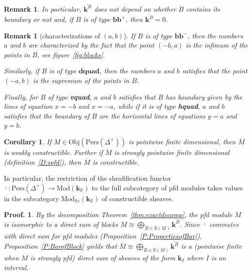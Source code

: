 \documentclass[a4paper, english, 11pt]{article}
\newcommand{\kk}[0]{\textbf{k}}
\newcommand{\Mod}[0]{\text{Mod}}
\newcommand{\Pe}{\text{Pers}}
\newcommand{\0}{\vec{0}}
\newcommand{\R}[0]{\mathbb{R}}
\newcommand{\Obj}[0]{\text{Obj}}
\newtheorem*{pf}{Proof.} }
\newtheorem{cor}[prop]{Corollary}
\newtheorem{remark}[prop]{Remark}
\begin{document}
\begin{remark}
In particular, $\overline{\kk^B}$ does not depend on whether $B$ contains its boundary or not and, if $B$ is of type $\textbf{bb}^+$, then $\overline{\kk^B} =0$. 
\end{remark}
\begin{remark}[characterizations of $(a,b)$]\label{R:caracofab}
 If $B$ is of type $\textbf{bb}^-$, then the numbers $a$ and $b$ are characterized by the fact that the point $(-b,a)$ is the infimum of the points in $B$, see figure~\eqref{fig:blocks}.
 
 Similarly, if $B$ is of type $\textbf{dquad}$, then the numbers $a$ and $b$ satisfies that the point $(-a,b)$ is the supremum of the points in $B$. 
 
 Finally, for $B$ of type \textbf{vquad}, $a$ and $b$ satisfies that $B$ has boundary given by the lines of equation $x=-b$ and $x=-a$, while if it is of type \textbf{hquad}, $a$ and $b$ satisfies that the boundary of $B$ are the horizontal lines of equations $y=a$ and $y=b$.
\end{remark}


\begin{cor}\label{C:pfdimpliesconstructible}
 If $M \in \Obj(\Pe(\Delta^{+}))$ is pointwise finite dimensional, then $\overline{M}$ is weakly constructible. 
 Further if $M$ is strongly pointwise finite dimensional (definition~\ref{D:spfd}), then $\overline{M}$ is constructible. 
\end{cor}
In particular, the restriction of the sheafification functor $\overline{\cdot}:\Pe(\Delta^{+})\to \Mod(\kk_\R)$ to the full subcategory of pfd modules takes values in the subcategory $ \Mod_{\R c}(\kk_\R)$ of constructible sheaves.
\begin{pf}
 By the decomposition Theorem~\ref{thm:exactdecomp}, the pfd module $M$ is isomorphic to a direct sum of blocks $M\cong  \bigoplus_{B\in \mathbb{B}(M)} \kk^B$. Since $\overline{\cdot}$ commutes with direct sum for pfd modules (Proposition~\ref{P:PropertiesofBar}), Proposition~\ref{P:BarofBlock} yields that $\overline{M} \cong \bigoplus_{B\in \mathbb{B}(M)} \overline{\kk^B} $ is a (pointwise finite when $M$ is strongly pfd) direct sum of sheaves of the form $\kk_{I}$ where $I$ is an interval. 
\end{pf}
\end{document}
